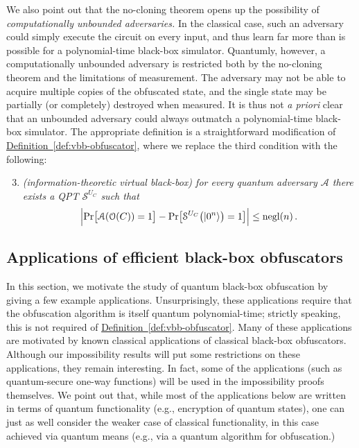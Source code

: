 \documentclass[11pt]{article}
\numberwithin{equation}{section}
\newcommand{\opn}{\operatorname}
\newcommand{\expref}[2]{\texorpdfstring{\hyperref[#2]{#1~\ref{#2}}}{#1~\ref{#2}}}
\newcommand{\negl}{\opn{negl}}
\newcommand{\prob}{\opn{Pr}}
\newcommand{\ga}[1]{{ \textcolor{purple}{(Gorjan:  #1)}}{}}
\begin{document}
{%

We also point out that the no-cloning theorem opens up the possibility of \emph{computationally unbounded adversaries.} In the classical case, such an adversary could simply execute the circuit on every input, and thus learn far more than is possible for a polynomial-time black-box simulator. Quantumly, however, a computationally unbounded adversary is restricted both by the no-cloning theorem and the limitations of measurement. The adversary may not be able to acquire multiple copies of the obfuscated state, and the single state may be partially (or completely) destroyed when measured. It is thus not \emph{a priori} clear that an unbounded adversary could always outmatch a polynomial-time black-box simulator. The appropriate definition is a straightforward modification of \expref{Definition}{def:vbb-obfuscator}, where we replace the third condition with the following:

\begin{enumerate}
\setcounter{enumi}{2}
\item \emph{(information-theoretic virtual black-box) for every quantum adversary $\mathcal A$ there exists a QPT $\mathcal S^{U_C}$ such that}
$$
\Bigl| \prob \bigl[\mathcal A(\mathcal O(C)) = 1\bigr] - \prob \bigl[\mathcal S^{U_C}\bigl(\ket{0^n}\bigr) = 1\bigr] \Bigr| \leq \negl(n)\,.
$$
\end{enumerate}

\subsection{Applications of efficient black-box obfuscators}\label{sec:vbb-applications}

In this section, we motivate the study of quantum black-box obfuscation by giving a few example applications. Unsurprisingly, these applications require that the obfuscation algorithm is itself quantum polynomial-time; strictly speaking, this is not required of \expref{Definition}{def:vbb-obfuscator}. Many of these applications are motivated by known classical applications of classical black-box obfuscators. Although our impossibility results will put some restrictions on these applications, they remain interesting. In fact, some of the applications (such as quantum-secure one-way functions) will be used in the impossibility proofs themselves. We point out that, while most of the applications below are written in terms of quantum functionality (e.g., encryption of quantum states), one can just as well consider the weaker case of classical functionality, in this case achieved via quantum means (e.g., via a quantum algorithm for obfuscation.)

}
\end{document}
